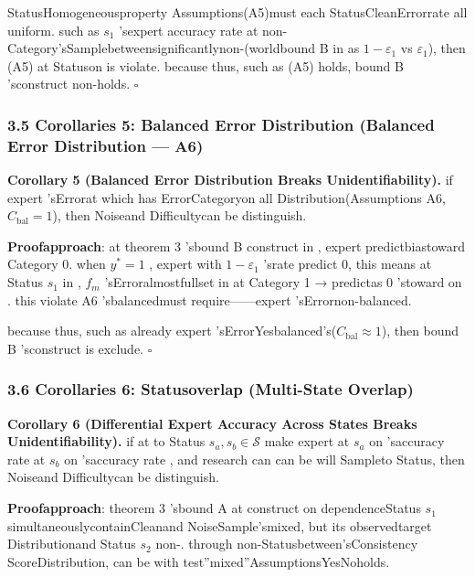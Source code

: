 \documentclass[
  12pt,
]{article}
\begin{document}
StatusHomogeneousproperty Assumptions(A5)must each StatusCleanErrorrate all uniform. such as  \(s_1\)
'sexpert accuracy rate at non-Category'sSamplebetweensignificantlynon-(worldbound  B in as 
\(1-\varepsilon_1\) vs \(\varepsilon_1\)), then  (A5)
at Statuson is violate. because thus, such as  (A5) holds, bound  B 'sconstruct non-holds. \(\square\)

\subsubsection{3.5 Corollaries 5: Balanced Error Distribution (Balanced Error Distribution ---
A6)}\label{ux63a8ux8bba-5ux5e73ux8861ux8befux5deeux5206ux5e03-balanced-error-distribution-a6}

\textbf{Corollary 5 (Balanced Error Distribution Breaks
Unidentifiability).} if expert 'sErrorat which has ErrorCategoryon all Distribution(Assumptions
A6, \(C_{\text{bal}} = 1\)), then Noiseand Difficultycan be distinguish. 

\textbf{Proofapproach}: at theorem  3 'sbound  B construct in , expert predictbiastoward Category 0. when 
\(y^* = 1\) , expert with  \(1 - \varepsilon_1\) 'srate predict
0, this means at Status \(s_1\) in , \(f_m\) 'sErroralmostfullset in at Category 1 →
predictas  0 'stoward on . this violate A6 'sbalancedmust require------expert 'sErrornon-balanced. 

because thus, such as already expert 'sErrorYesbalanced's(\(C_{\text{bal}} \approx 1\)), then bound 
B 'sconstruct is exclude. \(\square\)

\subsubsection{3.6 Corollaries 6: Statusoverlap (Multi-State
Overlap)}\label{ux63a8ux8bba-6ux591aux72b6ux6001ux4ea4ux53e0-multi-state-overlap}

\textbf{Corollary 6 (Differential Expert Accuracy Across States Breaks
Unidentifiability).} if at to Status \(s_a, s_b \in \mathcal{S}\)
make expert at  \(s_a\) on 'saccuracy rate \textbf{}at  \(s_b\)
on 'saccuracy rate , and research can can be will Sampleto Status, then Noiseand Difficultycan be distinguish. 

\textbf{Proofapproach}: theorem  3 'sbound  A at construct on dependenceStatus \(s_1\)
simultaneouslycontainCleanand NoiseSample'smixed, but its observedtarget Distributionand Status \(s_2\)
non-. through non-Statusbetween'sConsistency ScoreDistribution, can be with test''mixed''AssumptionsYesNoholds. 
\end{document}
